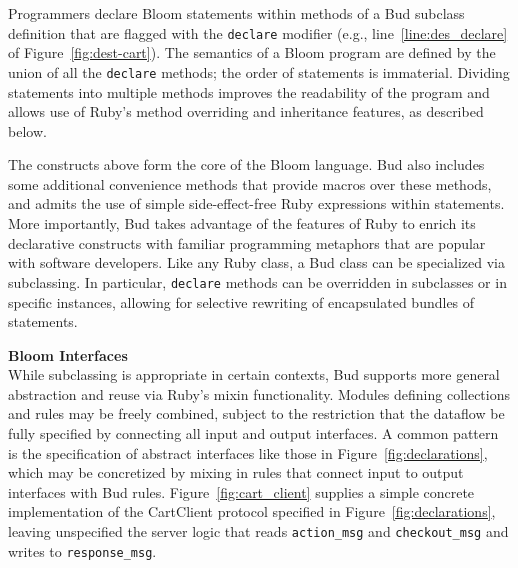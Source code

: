Programmers declare Bloom statements within methods of a Bud subclass
definition that are flagged with the \texttt{declare} modifier (e.g.,
line~\ref{line:des_declare} of Figure~\ref{fig:dest-cart}). The semantics
of a Bloom program are defined by the union of all the \texttt{declare}
methods; the order of statements is immaterial. Dividing statements into multiple
methods improves the readability of the program and allows use of Ruby's method
overriding and inheritance features, as described below.


The constructs above form the core of the Bloom language.
Bud also includes some additional convenience methods that provide macros over these methods, and admits the use of simple side-effect-free Ruby expressions within statements.  More importantly, Bud takes advantage of the features of Ruby to enrich its declarative constructs with familiar programming metaphors that are popular with software developers.  Like any Ruby class, a Bud class can be specialized via subclassing.  In particular, \texttt{declare} methods can be overridden in subclasses or in specific instances, allowing for selective rewriting of encapsulated bundles of statements.%

\vspace{9pt}\noindent \textbf{Bloom Interfaces}\\
While subclassing is appropriate in certain contexts, Bud supports more general abstraction and reuse via 
Ruby's mixin functionality.  Modules defining collections and rules may be freely combined, subject to the restriction
that the dataflow be fully specified by connecting all input and output interfaces.  A common pattern is the
specification of abstract interfaces like those in Figure~\ref{fig:declarations}, which may be concretized by 
mixing in rules that connect input to output interfaces with Bud rules.  Figure~\ref{fig:cart_client} supplies
a simple concrete implementation of the CartClient protocol specified in Figure~\ref{fig:declarations}, leaving
unspecified the server logic that reads \texttt{action\_msg} and \texttt{checkout\_msg} and writes to
\texttt{response\_msg}.


